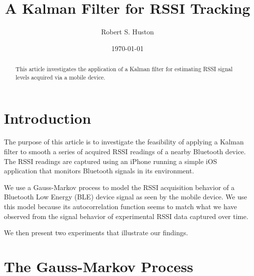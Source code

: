 \documentclass[12pt]{article}
\begin{document}
\setlength{\parskip}{12pt}      %



\title{A Kalman Filter for RSSI Tracking}
\author{Robert S. Huston}
\date{\today}

\maketitle

\vspace{24pt}

\begin{abstract}
This article investigates the application of a Kalman filter for estimating RSSI signal
levels acquired via a mobile device.
\end{abstract}



%
%

\section{Introduction}

The purpose of this article is to investigate the feasibility of applying a Kalman filter
to smooth a series of acquired RSSI readings of a nearby Bluetooth device. The RSSI readings
are captured using an iPhone running a simple iOS application that monitors Bluetooth signals
in its environment.

We use a Gauss-Markov process to model the RSSI acquisition behavior of a Bluetooth Low
Energy (BLE) device signal as seen by the mobile device. We use this model because its
autocorrelation function seems to match what we have observed from the signal behavior of
experimental RSSI data captured over time.

We then present two experiments that illustrate our findings.



%
%

\section{The Gauss-Markov Process}
\end{document}
